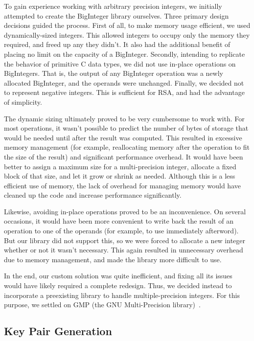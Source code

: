 \documentclass[a4paper]{article}
\begin{document}
To gain experience working with arbitrary precision integers, we initially attempted to create the BigInteger library ourselves. Three primary design decisions guided the process. First of all, to make memory usage efficient, we used dynamically-sized integers. This allowed integers to occupy only the memory they required, and freed up any they didn't. It also had the additional benefit of placing no limit on the capacity of a BigInteger. Secondly, intending to replicate the behavior of primitive C data types, we did not use in-place operations on BigIntegers. That is, the output of any BigInteger operation was a newly allocated BigInteger, and the operands were unchanged. Finally, we decided not to represent negative integers. This is sufficient for RSA, and had the advantage of simplicity.

The dynamic sizing ultimately proved to be very cumbersome to work with. For most operations, it wasn't possible to predict the number of bytes of storage that would be needed until after the result was computed. This resulted in excessive memory management (for example, reallocating memory after the operation to fit the size of the result) and significant performance overhead. It would have been better to assign a maximum size for a multi-precision integer, allocate a fixed block of that size, and let it grow or shrink as needed. Although this is a less efficient use of memory, the lack of overhead for managing memory would have cleaned up the code and increase performance significantly.

Likewise, avoiding in-place operations proved to be an inconvenience. On several occasions, it would have been more convenient to write back the result of an operation to one of the operands (for example, to use immediately afterword). But our library did not support this, so we were forced to allocate a new integer whether or not it wasn't necessary. This again resulted in unnecessary overhead due to memory management, and made the library more difficult to use.



In the end, our custom solution was quite inefficient, and fixing all its issues would have likely required a complete redesign. Thus, we decided instead to incorporate a preexisting library to handle multiple-precision integers. For this purpose, we settled on GMP (the GNU Multi-Precision library)~\cite{gmpmultiple}.

\subsection{Key Pair Generation}
\end{document}
